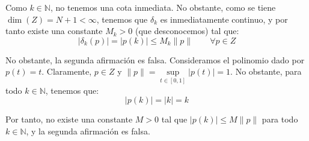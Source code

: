 \documentclass[12pt]{article}
\begin{document}
\begin{ejercicio}
\begin{enumerate}
                Como $k\in \mathbb{N}$, no tenemos una cota inmediata. No obstante, como se tiene $\dim(Z) = N+1 < \infty$, tenemos que $\delta_k$ es inmediatamente continuo, y por tanto existe una constante $M_k>0$ (que desconocemos) tal que:
                \begin{equation*}
                    |\delta_k(p)| = |p(k)| \leq M_k\|p\| \qquad \forall p\in Z
                \end{equation*}

                No obstante, la segunda afirmación es falsa. Consideramos el polinomio dado por $p(t) = t$. Claramente, $p\in Z$ y $\|p\| = \sup\limits_{t\in [0,1]} |p(t)| = 1$. No obstante, para todo $k\in \mathbb{N}$, tenemos que:
                \begin{equation*}
                    |p(k)| = |k| = k
                \end{equation*}

                Por tanto, no existe una constante $M>0$ tal que $|p(k)|\leq M\|p\|$ para todo $k\in \mathbb{N}$, y la segunda afirmación es falsa.
        \end{enumerate}
    \end{ejercicio}
\end{document}
